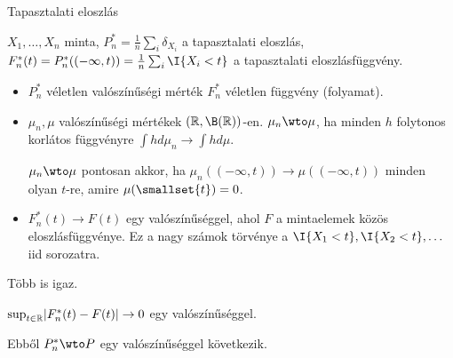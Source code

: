 \documentclass[aspectratio=169,notheorems,9pt,\option]{beamer}
\begin{document}
\begin{frame}{Tapasztalati eloszlás}
  \begin{df}
      $X_1,\dots, X_n$ minta, $P_n^*=\frac1n \sum_{i}\delta_{X_i}$ a
      tapasztalati eloszlás, $F_n^*(t)=P_n^*((-\infty,t))=\frac1n\sum_i\I{X_i<t}$ a tapasztalati eloszlásfüggvény. 
  \end{df}
  \begin{itemize}
      \item $P_n^*$ véletlen valószínűségi mérték $F_n^*$ véletlen függvény (folyamat).
      \item $\mu_n,\mu$ valószínűségi mértékek $(\real,\B(\real))$-en. 
      $\mu_n\wto \mu$, ha minden $h$ folytonos korlátos függvényre $\int h d\mu_n\to\int h d\mu$.

      $\mu_n\wto\mu$ pontosan akkor, ha $\mu_n((-\infty,t))\to \mu((-\infty,t))$ minden olyan $t$-re, amire $\mu(\smallset{t})=0$.

      \item $F_n^*(t)\to F(t)$ egy valószínűséggel, ahol $F$ a mintaelemek közös eloszlásfüggvénye. Ez a nagy számok törvénye a 
      $\I{X_1<t},\I{X_2<t},\dots$ iid sorozatra. 
  \end{itemize}
  Több is igaz.
  \begin{theorem}
      $\sup_{t\in\mathbb{R}}\lvert F_n^*(t)-F(t)\rvert\to0$ egy valószínűséggel.
  \end{theorem}
  \continue
  Ebből $P_n^*\wto P$ egy valószínűséggel következik.
\end{frame}
\end{document}
